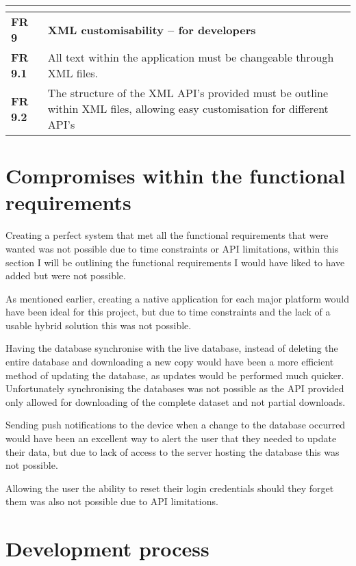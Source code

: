 \begin{center}
\begin{longtable}{| l | p{13cm} |}
\textbf{}  &  \\ \hline
\textbf{FR 9}   & \textbf{XML customisability – for developers} \\ \hline
\textbf{FR 9.1} & All text within the application must be changeable through XML files.  \\ \hline
\textbf{FR 9.2} & The structure of the XML API's provided must be outline within XML files, allowing easy customisation for different API's\\ \hline 
\end{longtable}
\end{center}

\section{Compromises within the functional requirements }

Creating a perfect system that met all the functional requirements that were wanted was not possible due to time constraints or API limitations, within this section I will be outlining the functional requirements I would have liked to have added but were not possible.

As mentioned earlier, creating a native application for each major platform would have been ideal for this project, but due to time constraints and the lack of a usable hybrid solution this was not possible.

Having the database synchronise with the live database, instead of deleting the entire database and downloading a new copy would have been a more efficient method of updating the database, as updates would be performed much quicker. Unfortunately synchronising the databases was not possible as the API provided only allowed for downloading of the complete dataset and not partial downloads.

Sending push notifications to the device when a change to the database occurred would have been an excellent way to alert the user that they needed to update their data, but due to lack of access to the server hosting the database this was not possible. 

Allowing the user the ability to reset their login credentials should they forget them was also not possible due to API limitations.

\section{Development process}

